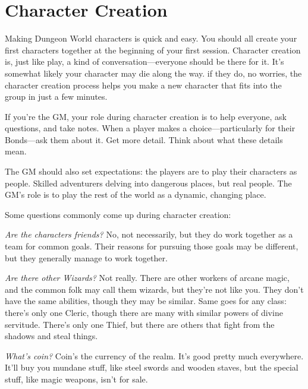 \chapter{Character Creation}
   
 



Making Dungeon World characters is quick and easy. You should all create your first characters together at the beginning of your first session. Character creation is, just like play, a kind of conversation—everyone should be there for it. It's somewhat likely your character may die along the way. if they do, no worries, the character creation process helps you make a new character that fits into the group in just a few minutes.

 

If you're the GM, your role during character creation is to help everyone, ask questions, and take notes. When a player makes a choice—particularly for their Bonds—ask them about it. Get more detail. Think about what these details mean.

 

The GM should also set expectations: the players are to play their characters as people. Skilled adventurers delving into dangerous places, but real people. The GM's role is to play the rest of the world as a dynamic, changing place.

 

Some questions commonly come up during character creation:

 

{\em Are the characters friends?}  No, not necessarily, but they do work together as a team for common goals. Their reasons for pursuing those goals may be different, but they generally manage to work together.

 

{\em Are there other Wizards?}  Not really. There are other workers of arcane magic, and the common folk may call them wizards, but they're not like you. They don't have the same abilities, though they may be similar. Same goes for any class: there's only one Cleric, though there are many with similar powers of divine servitude. There's only one Thief, but there are others that fight from the shadows and steal things.

 

{\em What's coin?}  Coin's the currency of the realm. It's good pretty much everywhere. It'll buy you mundane stuff, like steel swords and wooden staves, but the special stuff, like magic weapons, isn't for sale.

